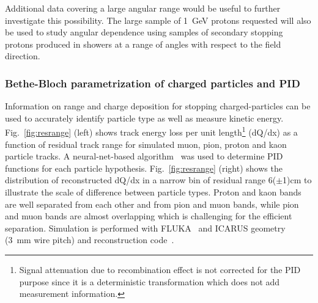 Additional data covering a large angular range would be useful to further investigate this possibility.
The large sample of 1~GeV protons requested will also be used to study angular dependence using 
samples of secondary stopping protons produced in showers at a range of angles with
respect to the field direction.

\subsubsection{Bethe-Bloch parametrization of charged particles and PID}

%
\label{detbeam_pid}


Information on range and charge deposition for stopping charged-particles can be used to 
accurately identify particle type as well as measure kinetic energy. 
Fig.~\ref{fig:resrange}  (left) shows track energy loss per unit length\footnote{Signal attenuation due to recombination effect is not corrected for the PID purpose since it is a deterministic transformation which does not add measurement information.}
(dQ/dx) as a function of residual 
track range for simulated muon, pion, proton and kaon particle tracks. 
A neural-net-based algorithm~\cite{nn_pid,rd_pid}
was used to determine PID functions for each particle hypothesis.
Fig.~\ref{fig:resrange} (right) 
shows the distribution of reconstructed dQ/dx in a narrow bin of residual range 6($\pm$1)cm to illustrate the scale of difference between particle types. Proton and kaon bands are well separated from each other and from pion and muon bands, while pion and muon bands are almost overlapping which is challenging for the efficient separation. 
Simulation is performed with
FLUKA~\cite{fluka05} and ICARUS geometry (3~mm wire pitch) and reconstruction code~\cite{icarus_reco}.

